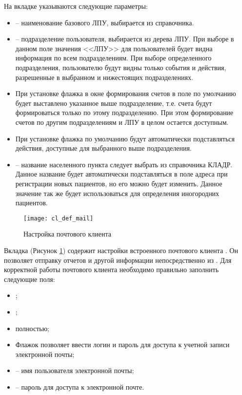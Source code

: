 На вкладке  указываются следующие параметры:
\begin{itemize}
 \item {} – наименование базового ЛПУ, выбирается из справочника.
 \item {} – подразделение пользователя, выбирается из дерева ЛПУ. При выборе в данном поле значения <<ЛПУ>> для пользователей будет видна информация по всем подразделениям. При выборе определенного подразделения, пользователю будут видны только события и действия, разрешенные в выбранном и нижестоящих подразделениях.
 \item При установке флажка  в окне формирования счетов в поле  по умолчанию будет выставлено указанное выше подразделение, т.е. счета будут формироваться только по этому подразделению. При этом формирование счетов по другим подразделениям и ЛПУ в целом остается доступным.
 \item При установке флажка  по умолчанию будут автоматически подставляться действия, доступные для выбранного выше подразделения.
 \item {} – название населенного пункта следует выбрать из справочника КЛАДР. Данное название будет автоматически подставляться в поле адреса при регистрации новых пациентов, но его можно будет изменить. Данное значение так же будет использоваться для определения иногородних пациентов.
\end{itemize}

\begin{figure}[ht]\centering
 \texttt{[image: cl\_def\_mail]}
 \caption{Настройка почтового клиента}
 \label{img_cl_def_mail}
\end{figure} 

Вкладка  (Рисунок \ref{img_cl_def_mail}) содержит настройки встроенного почтового клиента \tmis. Он позволяет отправку отчетов и другой информации непосредственно из \tmis. Для корректной работы почтового клиента необходимо правильно заполнить следующие поля:
\begin{itemize}
 \item {};
 \item {};
 \item {} полностью;
 \item Флажок  позволяет ввести логин и пароль для доступа к учетной записи электронной почты;
 \item {} – имя пользователя электронной почты;
 \item {} – пароль для доступа к электронной почте.
\end{itemize}

